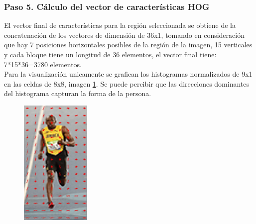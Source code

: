   \subsubsection{Paso 5. Cálculo del vector de características HOG}
  El vector final de características para la región seleccionada se obtiene de la concatenación de los vectores de dimensión de 36x1,  tomando en consideración que hay 7 posiciones horizontales posibles de la región de la imagen, 15 verticales y cada bloque tiene un longitud de 36 elementos, el vector final tiene: 7*15*36=3780 elementos.\\
  Para la visualización unicamente se grafican los histogramas normalizados de 9x1 en las celdas de 8x8, imagen \ref{fig: hogVis}. Se puede percibir que las direcciones dominantes del histograma capturan la forma de la persona.
   \begin{figure}[htbp]
   	\centering
   	\includegraphics[width=0.3\textwidth]{./pictures/hogVis}
   	\caption{}\label{fig: hogVis}
   \end{figure}
     
     
     
     
     
     
     
     
     
     
     
     
     
     
     
     
     
     
     
     
     
     
     
     

